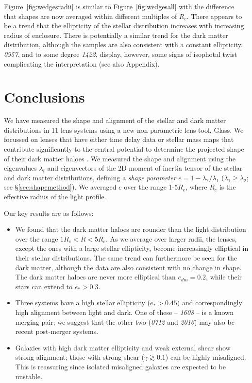 \documentclass[useAMS,usenatbib]{mn2e}
\def\Glass{{\sc Glass}}
\begin{document}
Figure~\ref{fig:wedgesradii} is similar to Figure~\ref{fig:wedgesall} with the difference that shapes are now averaged within different multiples of $R_e$. There appears to be a trend that the ellipticity of the stellar distribution increases with increasing radius of enclosure. There is potentially a similar trend for the dark matter distribution, although the samples are also consistent with a constant ellipticity. {\it0957}, and to some degree {\it1422}, display, however, some signs of isophotal twist complicating the interpretation (see also Appendix).


\section{Conclusions}\label{sec:conclusions}
We have measured the shape and alignment of the stellar and dark matter distributions in 11 lens systems using a new non-parametric lens tool, \Glass. We focussed on lenses that have either time delay data or stellar mass maps that contribute significantly to the central potential to determine the projected shape of their dark matter haloes \citep{2014MNRAS.445.2181C}. We measured the shape and alignment using the eigenvalues $\lambda_i$ and eigenvectors of the 2D moment of inertia tensor of the stellar and dark matter distributions, defining a {\it shape parameter} $e = 1 - \lambda_{2}/\lambda_{1}$ ($\lambda_{1} \geq \lambda_{2}$; see \S\ref{sec:shapemethod}). We averaged $e$ over the range 1-5$R_e$, where $R_e$ is the effective radius of the light profile.

Our key results are as follows:

\begin{itemize}
\item We found that the dark matter haloes are rounder than the light distribution over the range $1R_e < R < 5R_e$. As we average over larger radii, the lenses, except the ones with a large stellar ellipticity, become increasingly elliptical in their stellar distributions. The same trend can furthermore be seen for the dark matter, although the data are also consistent with no change in shape. The dark matter haloes are never more elliptical than $e_{dm} = 0.2$, while their stars can extend to $e_* > 0.3$.

\item Three systems have a high stellar ellipticity ($e_* > 0.45$) and correspondingly high alignment between light and dark. One of these -- {\it1608} -- is a known merging pair; we suggest that the other two ({\it0712} and {\it2016}) may also be recent post-merger systems. 

\item Galaxies with high dark matter ellipticity and weak external shear show strong alignment; those with strong shear ($\gamma \gtrsim 0.1$) can be highly misaligned. This is reassuring since isolated misaligned galaxies are expected to be unstable.
\end{itemize}
\end{document}
